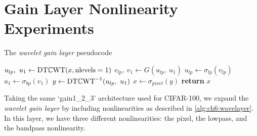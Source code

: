 \section{Gain Layer Nonlinearity Experiments}\label{sec:ch6:nonlinear_exps}
\begin{algorithm}[t]
  \caption{The \emph{wavelet gain layer} pseudocode}\label{alg:ch6:wavelayer}
\begin{algorithmic}[1]
  \State $u_{lp},\ u_{1} \gets \mathrm{DT}\mathbb{C}\mathrm{WT}(x, \mbox{nlevels}=1) $ 
  \State $v_{lp},\ v_{1} \gets G(u_{lp},\ u_{1}) $ 
  \State $u_{lp} \gets \sigma_{lp}(v_{lp})$ 
  \State $u_{1} \gets \sigma_{bp}(v_{1})$ 
  \State $y \gets \mathrm{DT}\mathbb{C}\mathrm{WT}^{-1}(u_{lp},\ u_{1})$
  \State $x \gets \sigma_{pixel}(y)$ 
  \State \textbf{return} $x$
\EndProcedure
\end{algorithmic}
\end{algorithm}
Taking the same `gain1\_2\_3' architecture used for CIFAR-100, we expand the
\emph{wavelet gain layer} by including nonlinearities as described in 
\autoref{alg:ch6:wavelayer}. In this layer, we have three different nonlinearities:
the pixel, the lowpass, and the bandpass nonlinearity.

